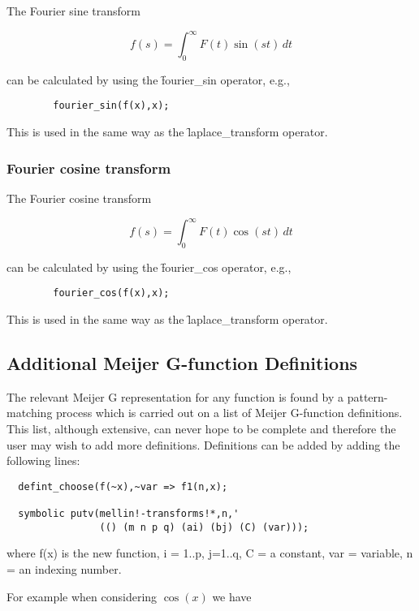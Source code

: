 The Fourier sine transform

\[
f(s) = \int_{0}^{\infty} F(t) \sin(st) \,dt
\]

can be calculated by using the \f{fourier\_sin} operator, e.g.,
\begin{verbatim}
        fourier_sin(f(x),x);
\end{verbatim}

This is used in the same way as the \f{laplace\_transform} operator.

\subsubsection{Fourier cosine transform}
\hypertarget{operator:FOURIER_COS}{}

The Fourier cosine transform

\[
f(s) = \int_{0}^{\infty} F(t) \cos(st) \,dt
\]

can be calculated by using the \f{fourier\_cos} operator, e.g.,
\begin{verbatim}
        fourier_cos(f(x),x);
\end{verbatim}

This is used in the same way as the \f{laplace\_transform} operator.

\subsection{Additional Meijer G-function Definitions}

The relevant Meijer G representation for any function is found by a
pattern-matching process which is carried out on a list of Meijer
G-function definitions. This list, although extensive, can never hope
to be complete and therefore the user may wish to add more definitions.
Definitions can be added by adding the following lines:

\begin{verbatim}
  defint_choose(f(~x),~var => f1(n,x);

  symbolic putv(mellin!-transforms!*,n,'
                (() (m n p q) (ai) (bj) (C) (var)));

\end{verbatim} 
     where f(x) is the new function, i = 1..p, j=1..q, C = a constant,
     var = variable, n = an indexing number.

For example when considering $\cos(x)$ we have

